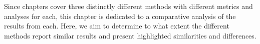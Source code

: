 Since chapters  cover three distinctly different methods with different metrics and analyses for each, this chapter is dedicated to a comparative analysis of the results from each. Here, we aim to determine to what extent the different methods report similar results and present highlighted similarities and differences.